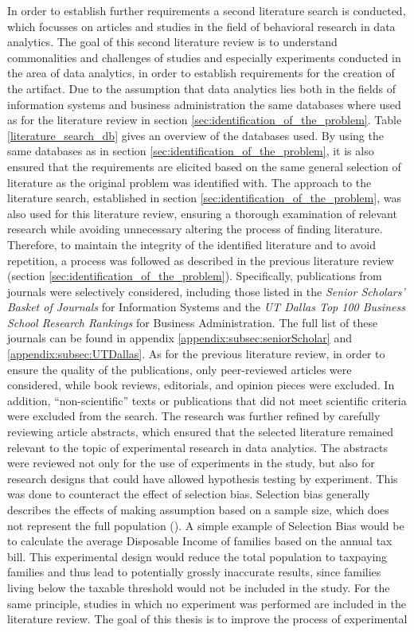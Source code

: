 In order to establish further requirements a second literature search is conducted, which focusses on articles and studies in the field of behavioral research in data analytics. The goal of this second literature review is to understand commonalities and challenges of studies and especially experiments conducted in the area of data analytics, in order to establish requirements for the creation of the artifact. %
Due to the assumption that data analytics lies both in the fields of information systems and business administration the same databases where used as for the literature review in section \ref{sec:identification_of_the_problem}. Table \ref{literature_search_db} gives an overview of the databases used. By using the same databases as in section \ref{sec:identification_of_the_problem}, it is also ensured that the requirements are elicited based on the same general selection of literature as the original problem was identified with. The approach to the literature search, established in section \ref{sec:identification_of_the_problem}, was also used for this literature review, ensuring a thorough examination of relevant research while avoiding unnecessary altering the process of finding literature. Therefore, to maintain the integrity of the identified literature and to avoid repetition, a process was followed as described in the previous literature review (section \ref{sec:identification_of_the_problem}). Specifically, publications from journals were selectively considered, including those listed in the \textit{Senior Scholars' Basket of Journals} for Information Systems and the \textit{UT Dallas Top 100 Business School Research Rankings} for Business Administration. The full list of these journals can be found in appendix \ref{appendix:subsec:seniorScholar} and \ref{appendix:subsec:UTDallas}. As for the previous literature review, in order to ensure the quality of the publications, only peer-reviewed articles were considered, while book reviews, editorials, and opinion pieces were excluded. In addition, \enquote{non-scientific} texts or publications that did not meet scientific criteria were excluded from the search. The research was further refined by carefully reviewing article abstracts, which ensured that the selected literature remained relevant to the topic of experimental research in data analytics. The abstracts were reviewed not only for the use of experiments in the study, but also for research designs that could have allowed hypothesis testing by experiment. This was done to counteract the effect of selection bias. Selection bias generally describes the effects of making assumption based on a sample size, which does not represent the full population (\cite{Heckman.2010}). A simple example of Selection Bias would be to calculate the average Disposable Income of families based on the annual tax bill. This experimental design would reduce the total population to taxpaying families and thus lead to potentially grossly inaccurate results, since families living below the taxable threshold would not be included in the study. For the same principle, studies in which no experiment was performed are included in the literature review. The goal of this thesis is to improve the process of experimental 